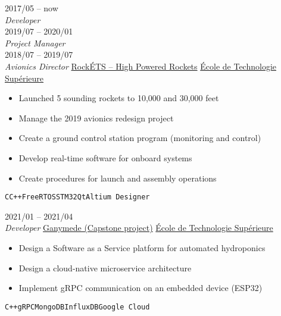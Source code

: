 \documentclass[9pt]{developercv} %
\begin{document}
\begin{minipage}[t]{0.8\textwidth}

\begin{entrylist}
	\entry
		{2017/05 -- now\\{\small\emph{Developer}}\\2019/07 -- 2020/01\\{\small\emph{Project Manager}}\\2018/07 -- 2019/07\\{\small\emph{Avionics Director}}}
		{\href{https://clubrockets.ca/en/}{RockÉTS -- High Powered Rockets}}
		{\href{https://clubrockets.ca/en/}{École de Technologie Supérieure}}
		{
			\vspace{-14pt}
			\begin{itemize}
				\renewcommand{\labelitemi}{\raisebox{.45ex}{\rule{.6ex}{.6ex}}}
				\setlength\itemsep{-1pt}
				\item Launched 5 sounding rockets to 10,000 and 30,000 feet
				\item Manage the 2019 avionics redesign project
				\item Create a ground control station program (monitoring and control)
				\item Develop real-time software for onboard systems
				\item Create procedures for launch and assembly operations
			\end{itemize}
			\vspace{-4pt}
			\texttt{C}\slashsep\texttt{C++}\slashsep\texttt{FreeRTOS}\slashsep\texttt{STM32}\slashsep\texttt{Qt}\slashsep\texttt{Altium Designer}
		}
	\entry
		{2021/01 -- 2021/04\\{\small\emph{Developer}}}
		{\href{https://github.com/ngc7293/ganymede}{Ganymede (Capstone project)}}
		{\href{}{École de Technologie Supérieure}}
		{
			\vspace{-14pt}
			\begin{itemize}
				\renewcommand{\labelitemi}{\raisebox{.45ex}{\rule{.6ex}{.6ex}}}
				\setlength\itemsep{-1pt}
				\item Design a Software as a Service platform for automated hydroponics
				\item Design a cloud-native microservice architecture
				\item Implement gRPC communication on an embedded device (ESP32)
			\end{itemize}
			\vspace{-4pt}
			\texttt{C++}\slashsep\texttt{gRPC}\slashsep\texttt{MongoDB}\slashsep\texttt{InfluxDB}\slashsep\texttt{Google Cloud}
		}
\end{entrylist}



\end{minipage}
\end{document}
